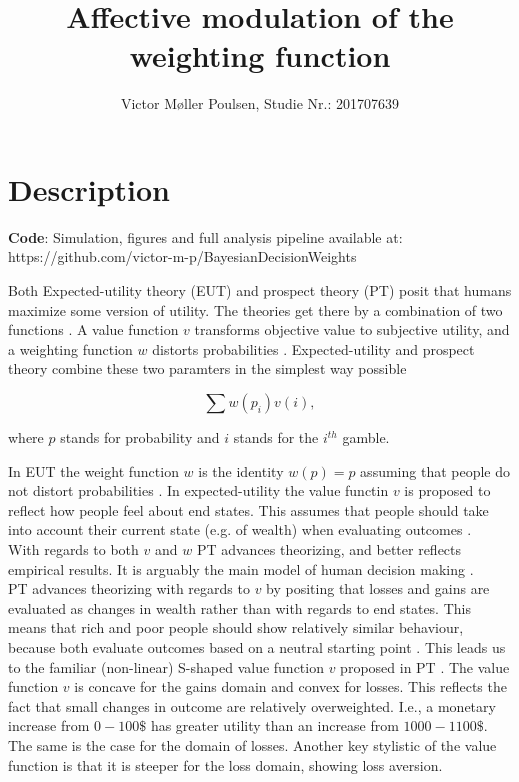\documentclass[12pt]{article}
\title{Affective modulation of the weighting function}
\author{Victor Møller Poulsen, Studie Nr.: 201707639}
\begin{document}
\maketitle
\leavevmode

\section{Description}

\textbf{Code}: Simulation, figures and
full analysis pipeline available at: \\
https://github.com/victor-m-p/BayesianDecisionWeights

\vspace{3mm}

Both Expected-utility theory (EUT) and prospect theory
(PT) posit that humans maximize some version of
utility. The theories get there by a
combination of two functions
\autocite{rottenstreich2001money}.
A value function $v$ transforms objective value to
subjective utility, and a weighting function $w$
distorts probabilities \autocite{rottenstreich2001money,
gonzalez1999shape}. Expected-utility and
prospect theory combine these two paramters in
the simplest way possible
\autocite{rottenstreich2001money}

\[
	\sum w(p_i)v(i),
\]

where $p$ stands for probability and $i$ stands for the
$i^{th}$ gamble.

In EUT the weight function $w$
is the identity $w(p) = p$ assuming that people do
not distort probabilities \autocite{rottenstreich2001money}.
In expected-utility the value functin $v$ is
proposed to reflect how people feel about
end states. This assumes that people should
take into account their current state (e.g. of wealth)
when evaluating outcomes
\autocite{newell2015straight}. \\

With regards to both $v$ and  $w$
PT \autocite{
	PT,
tversky1992advances} advances theorizing,
and better reflects empirical results.
It is arguably the main model of human decision making
\autocite{newell2015straight}. \\

PT advances theorizing
with regards to $v$ by positing that losses and
gains are evaluated as changes in wealth rather
than with regards to end states. This means that
rich and poor people should show relatively similar
behaviour, because both evaluate outcomes based
on a neutral starting point
\autocite{newell2015straight}.
This leads us to the familiar (non-linear) S-shaped
value function $v$ proposed in PT \autocite{PT}.
The value function $v$ is concave for the gains
domain and convex for losses. This reflects the
fact that small changes in outcome are relatively
overweighted. I.e., a monetary increase from
$0 - 100\$$ has greater utility than an increase
from $1000 - 1100\$$. The same is the case for the
domain of losses. Another key stylistic of the
value function is that it is steeper for the
loss domain, showing loss aversion. \\
\end{document}
